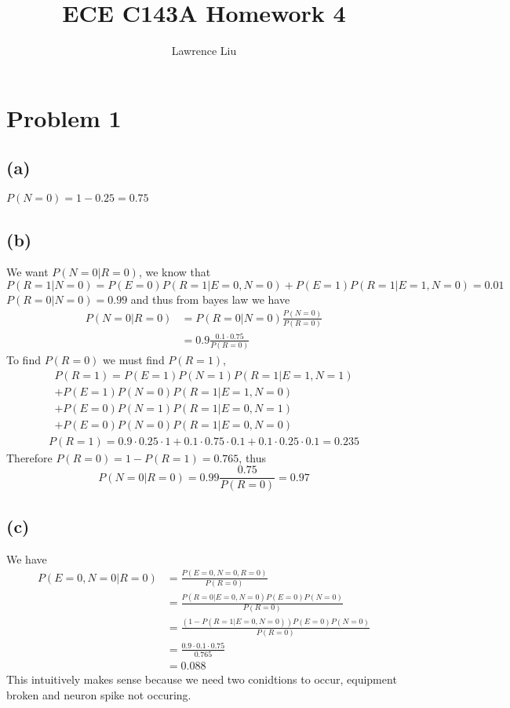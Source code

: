 \documentclass[12pt]{article}
\title{ECE C143A Homework 4}
\author{Lawrence Liu}
\begin{document}
\maketitle
\section*{Problem 1}
\subsection*{(a)}
$P(N=0)=1-0.25=\boxed{0.75}$
\subsection*{(b)}
We want $P(N=0|R=0)$, we know that
$$P(R=1|N=0)=P(E=0)P(R=1|E=0,N=0)+P(E=1)P(R=1|E=1,N=0)=0.01$$
$P(R=0|N=0)=0.99$ and thus from bayes law we have 
\begin{align*}
    P(N=0|R=0)&=P(R=0|N=0)\frac{P(N=0)}{P(R=0)}\\
    &=0.9\frac{0.1\cdot 0.75}{P(R=0)}
\end{align*}
To find $P(R=0)$ we must find $P(R=1)$,
\begin{multline*}
    P(R=1)=P(E=1)P(N=1)P(R=1|E=1,N=1)\\+P(E=1)P(N=0)P(R=1|E=1,N=0)
    \\+P(E=0)P(N=1)P(R=1|E=0,N=1)\\+P(E=0)P(N=0)P(R=1|E=0,N=0)
\end{multline*}
\begin{multline*}
    P(R=1)=0.9\cdot0.25\cdot 1+0.1\cdot0.75\cdot0.1+0.1\cdot 0.25\cdot 0.1=0.235
\end{multline*}
Therefore $P(R=0)=1-P(R=1)=0.765$, thus
$$P(N=0|R=0)=0.99\frac{0.75}{P(R=0)}=\boxed{0.97}$$
\subsection*{(c)}
We have
\begin{align*}
    P(E=0,N=0|R=0)&=\frac{P(E=0,N=0,R=0)} {P(R=0)}\\
    &=\frac{P(R=0|E=0,N=0)P(E=0)P(N=0)} {P(R=0)}\\
    &=\frac{(1-P(R=1|E=0,N=0))P(E=0)P(N=0)} {P(R=0)}\\
    &=\frac{0.9\cdot0.1\cdot0.75}{0.765}\\
    &=\boxed{0.088}
\end{align*}
This intuitively makes sense because we need two conidtions to occur, equipment broken and neuron spike not occuring.
\end{document}
